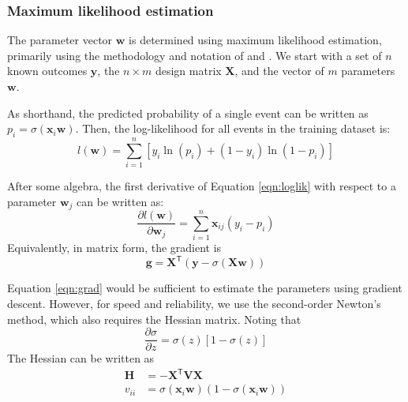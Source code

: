 \documentclass[12pt]{article}
\begin{document}
\subsubsection{Maximum likelihood estimation}

The parameter vector $ \mathbf{w} $ is determined using maximum likelihood estimation, 
primarily using the methodology and notation of \citet{Minka2001} and \citet{Pregibon1981}.
We start with a set of $n$ known outcomes $\mathbf{y}$, the $n \times m$ design matrix $\mathbf{X}$,
and the vector of $m$ parameters $\mathbf{w}$. 

As shorthand, the predicted probability of a single event can be written as $p_i =  \sigma(\mathbf{x}_i \mathbf{w})$.
Then, the log-likelihood for all events in the training dataset is:
\begin{equation}
    l(\mathbf{w}) = \sum_{i=1}^{n} \left[ y_i \ln(p_i) + (1 - y_i) \ln(1 - p_i) \right]
    \label{eqn:loglik}
\end{equation}

After some algebra, the first derivative of Equation \ref{eqn:loglik} with respect to a parameter
$\mathbf{w}_j$ can be written as:
\begin{equation}
    \frac{\partial l(\mathbf{w})}{\partial\mathbf{w}_j} = \sum_{i=1}^{n} \mathbf{x}_{ij} (y_i - p_i)
\end{equation}
Equivalently, in matrix form, the gradient is
\begin{equation}
    \mathbf{g} = \mathbf{X}^\mathsf{T} (\mathbf{y} - \sigma(\mathbf{X w}))
    \label{eqn:grad}
\end{equation}

Equation \ref{eqn:grad} would be sufficient to estimate the parameters using gradient descent. 
However, for speed and reliability, we use the second-order Newton's method, which also requires 
the Hessian matrix. 
Noting that 
\begin{equation}
    \frac{\partial{\sigma}}{\partial z} = \sigma(z) \left[1 - \sigma(z) \right]
\end{equation}
The Hessian can be written as
\begin{equation}
    \begin{aligned}
    \mathbf{H} &= -\mathbf{X}^\mathsf{T} \mathbf{V} \mathbf{X} \\
    v_{ii} &= \sigma(\mathbf{x}_i \mathbf{w}) (1 - \sigma(\mathbf{x}_i \mathbf{w})) \\
    \end{aligned}
    \label{eqn:hessian}
\end{equation}
\end{document}

